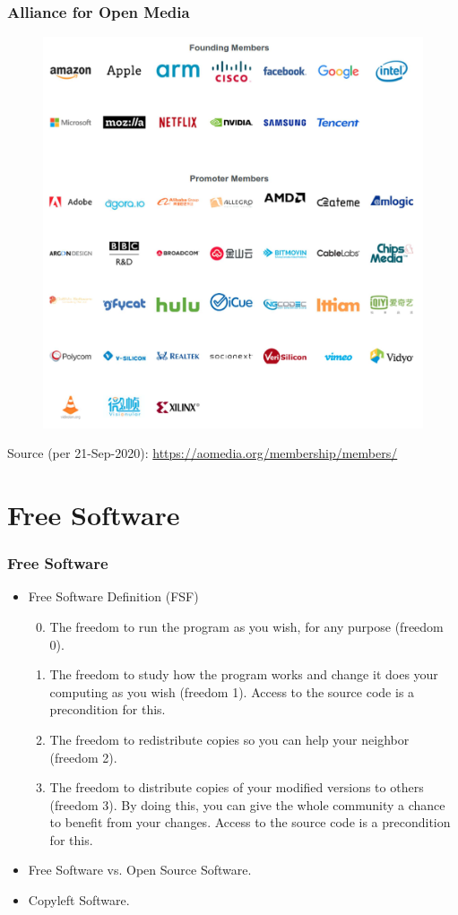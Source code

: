 \documentclass[xcolor=table, notheorems, hyperref={pdfpagelabels=false}]{beamer}
\begin{document}
\begin{frame}
\frametitle{Alliance for Open Media}
\begin{figure}
\includegraphics[width=0.49\linewidth]{os01-avy}
\end{figure}
{\small Source (per 21-Sep-2020): \url{https://aomedia.org/membership/members/}}
\end{frame}

\section{Free Software}
\begin{frame}
\frametitle{Free Software}
\begin{itemize}
\item Free Software Definition (FSF)
\begin{enumerate}
\setcounter{enumi}{-1}
\item The freedom to run the program as you wish, for any purpose (freedom 0).
\item The freedom to study how the program works and change it does your computing 
      as you wish (freedom 1). Access to the source code is a precondition for this.
\item The freedom to redistribute copies so you can help your neighbor (freedom 2).
\item The freedom to distribute copies of your modified versions to others (freedom 3).
      By doing this, you can give the whole community a chance to benefit from your changes.
      Access to the source code is a precondition for this.
\end{enumerate}
\item Free Software vs. Open Source Software.
\item Copyleft Software.
\end{itemize}
\end{frame}
\end{document}
